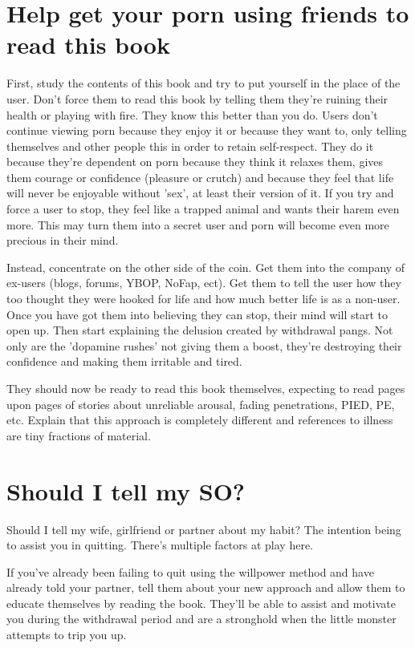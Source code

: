 \documentclass[easypeasy.tex]{subfiles}
\begin{document}
\section{Help get your porn using friends to read this book}

First, study the contents of this book and try to put yourself in the place of the user. Don't force them to read this book by telling them they're ruining their health or playing with fire. They know this better than you do. Users don't continue viewing porn because they enjoy it or because they want to, only telling themselves and other people this in order to retain self-respect. They do it because they're dependent on porn because they think it relaxes them, gives them courage or confidence (pleasure or crutch) and because they feel that life will never be enjoyable without 'sex', at least their version of it. If you try and force a user to stop, they feel like a trapped animal and wants their harem even more. This may turn them into a secret user and porn will become even more precious in their mind.

Instead, concentrate on the other side of the coin. Get them into the company of ex-users (blogs, forums, YBOP, NoFap, ect). Get them to tell the user how they too thought they were hooked for life and how much better life is as a non-user. Once you have got them into believing they can stop, their mind will start to open up. Then start explaining the delusion created by withdrawal pangs. Not only are the 'dopamine rushes' not giving them a boost, they're destroying their confidence and making them irritable and tired.

They should now be ready to read this book themselves, expecting to read pages upon pages of stories about unreliable arousal, fading penetrations, PIED, PE, etc. Explain that this approach is completely different and references to illness are tiny fractions of material.

\section{Should I tell my SO?}

Should I tell my wife, girlfriend or partner about my habit? The intention being to assist you in quitting. There's multiple factors at play here.

If you've already been failing to quit using the willpower method and have already told your partner, tell them about your new approach and allow them to educate themselves by reading the book. They'll be able to assist and motivate you during the withdrawal period and are a stronghold when the little monster attempts to trip you up.
\end{document}
